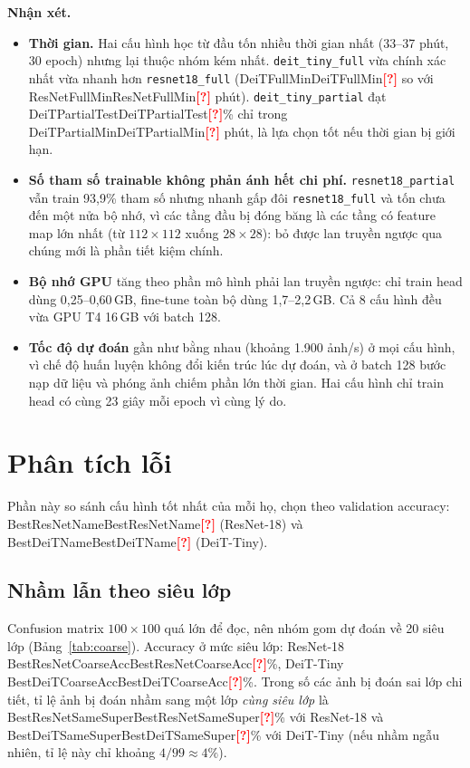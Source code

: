 \documentclass[12pt]{article}
\newcommand{\code}[1]{\texttt{#1}}
\newcommand{\st}[1]{\textbf{#1}}
\newcommand{\todo}[1]{\textcolor{red}{\textbf{[#1]}}}
\newcommand{\val}[1]{\ifcsname #1\endcsname\csname #1\endcsname\else\todo{?}\fi}
\begin{document}
\textbf{Nhận xét.}
\begin{itemize}
  \item \st{Thời gian.} Hai cấu hình học từ đầu tốn nhiều thời gian nhất (33--37 phút, 30 epoch) nhưng lại thuộc nhóm
        kém nhất. \code{deit\_tiny\_full} vừa chính xác nhất vừa nhanh hơn \code{resnet18\_full}
        (\val{DeiTFullMin} so với \val{ResNetFullMin} phút). \code{deit\_tiny\_partial} đạt \val{DeiTPartialTest}\% chỉ trong
        \val{DeiTPartialMin} phút, là lựa chọn tốt nếu thời gian bị giới hạn.
  \item \st{Số tham số trainable không phản ánh hết chi phí.} \code{resnet18\_partial} vẫn train 93,9\% tham số nhưng nhanh
        gấp đôi \code{resnet18\_full} và tốn chưa đến một nửa bộ nhớ, vì các tầng đầu bị đóng băng là các tầng có feature map
        lớn nhất (từ $112\times112$ xuống $28\times28$): bỏ được lan truyền ngược qua chúng mới là phần tiết kiệm chính.
  \item \st{Bộ nhớ GPU} tăng theo phần mô hình phải lan truyền ngược: chỉ train head dùng 0,25--0,60\,GB, fine-tune toàn bộ
        dùng 1,7--2,2\,GB. Cả 8 cấu hình đều vừa GPU T4 16\,GB với batch 128.
  \item \st{Tốc độ dự đoán} gần như bằng nhau (khoảng 1.900 ảnh/s) ở mọi cấu hình, vì chế độ huấn luyện không đổi kiến trúc
        lúc dự đoán, và ở batch 128 bước nạp dữ liệu và phóng ảnh chiếm phần lớn thời gian. Hai cấu hình chỉ train head có
        cùng 23 giây mỗi epoch vì cùng lý do.
\end{itemize}

\section{Phân tích lỗi}\label{sec:errors}
Phần này so sánh cấu hình tốt nhất của mỗi họ, chọn theo validation accuracy: \val{BestResNetName} (ResNet-18) và
\val{BestDeiTName} (DeiT-Tiny).

\subsection{Nhầm lẫn theo siêu lớp}
Confusion matrix $100\times100$ quá lớn để đọc, nên nhóm gom dự đoán về 20 siêu lớp (Bảng~\ref{tab:coarse}).
Accuracy ở mức siêu lớp: ResNet-18 \val{BestResNetCoarseAcc}\%, DeiT-Tiny \val{BestDeiTCoarseAcc}\%.
Trong số các ảnh bị đoán sai lớp chi tiết, tỉ lệ ảnh bị đoán nhầm sang một lớp \emph{cùng siêu lớp} là
\val{BestResNetSameSuper}\% với ResNet-18 và \val{BestDeiTSameSuper}\% với DeiT-Tiny (nếu nhầm ngẫu nhiên, tỉ lệ này
chỉ khoảng $4/99 \approx 4\%$).
\end{document}
